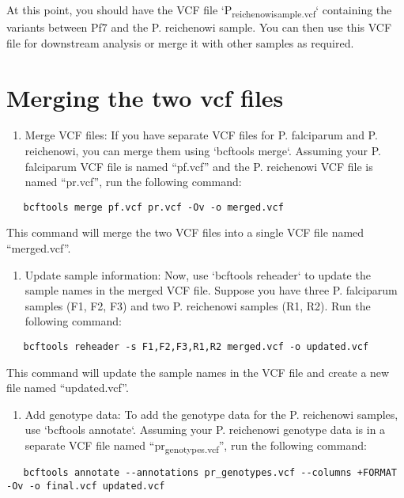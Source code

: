 \documentclass[11pt]{article}
\begin{document}
At this point, you should have the VCF file `P\textsubscript{reichenowi}\textsubscript{sample.vcf}` containing the variants between Pf7 and the P. reichenowi sample. You can then use this VCF file for downstream analysis or merge it with other samples as required.

\section{Merging the two vcf files}
\label{sec:orgfa39da3}
\begin{enumerate}
\item Merge VCF files: If you have separate VCF files for P. falciparum and P. reichenowi, you can merge them using `bcftools merge`. Assuming your P. falciparum VCF file is named ``pf.vcf'' and the P. reichenowi VCF file is named ``pr.vcf'', run the following command:
\end{enumerate}

\begin{verbatim}
   bcftools merge pf.vcf pr.vcf -Ov -o merged.vcf
\end{verbatim}

This command will merge the two VCF files into a single VCF file named ``merged.vcf''.

\begin{enumerate}
\item Update sample information: Now, use `bcftools reheader` to update the sample names in the merged VCF file. Suppose you have three P. falciparum samples (F1, F2, F3) and two P. reichenowi samples (R1, R2). Run the following command:
\end{enumerate}

\begin{verbatim}
   bcftools reheader -s F1,F2,F3,R1,R2 merged.vcf -o updated.vcf
\end{verbatim}

This command will update the sample names in the VCF file and create a new file named ``updated.vcf''.

\begin{enumerate}
\item Add genotype data: To add the genotype data for the P. reichenowi samples, use `bcftools annotate`. Assuming your P. reichenowi genotype data is in a separate VCF file named ``pr\textsubscript{genotypes.vcf}'', run the following command:
\end{enumerate}

\begin{verbatim}
   bcftools annotate --annotations pr_genotypes.vcf --columns +FORMAT -Ov -o final.vcf updated.vcf
\end{verbatim}
\end{document}
